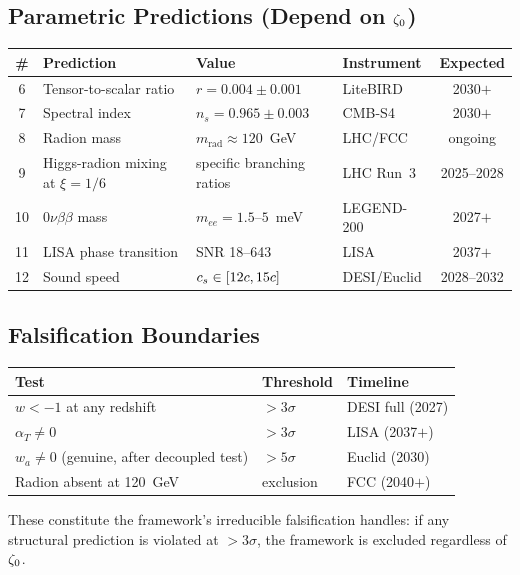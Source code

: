 \subsection*{Parametric Predictions (Depend on $\zeta_0$)}

\begin{center}
\small
\begin{tabular}{@{}c p{4.6cm} p{2.9cm} l c@{}}
\toprule
\textbf{\#} & \textbf{Prediction} & \textbf{Value} & \textbf{Instrument} & \textbf{Expected} \\
\midrule
6  & Tensor-to-scalar ratio & $r = 0.004 \pm 0.001$ & LiteBIRD & 2030$+$ \\
7  & Spectral index & $n_s = 0.965 \pm 0.003$ & CMB-S4 & 2030$+$ \\
8  & Radion mass & $m_{\mathrm{rad}} \approx 120$~GeV & LHC/FCC & ongoing \\
9  & Higgs-radion mixing at $\xi=1/6$ & specific branching ratios & LHC Run~3 & 2025--2028 \\
10 & $0\nu\beta\beta$ mass & $m_{ee} = 1.5$--$5$~meV & LEGEND-200 & 2027$+$ \\
11 & LISA phase transition & SNR 18--643 & LISA & 2037$+$ \\
12 & Sound speed & $c_s \in [12c, 15c]$ & DESI/Euclid & 2028--2032 \\
\bottomrule
\end{tabular}
\end{center}

\subsection*{Falsification Boundaries}

\begin{center}
\small
\begin{tabular}{@{}p{5.5cm} l l@{}}
\toprule
\textbf{Test} & \textbf{Threshold} & \textbf{Timeline} \\
\midrule
$w < -1$ at any redshift & $>3\sigma$ & DESI full (2027) \\
$\alpha_T \neq 0$ & $>3\sigma$ & LISA (2037$+$) \\
$w_a \neq 0$ (genuine, after decoupled test) & $>5\sigma$ & Euclid (2030) \\
Radion absent at 120~GeV & exclusion & FCC (2040$+$) \\
\bottomrule
\end{tabular}
\end{center}

These constitute the framework's irreducible falsification handles: if
any structural prediction is violated at $>3\sigma$, the framework is
excluded regardless of $\zeta_0$.

